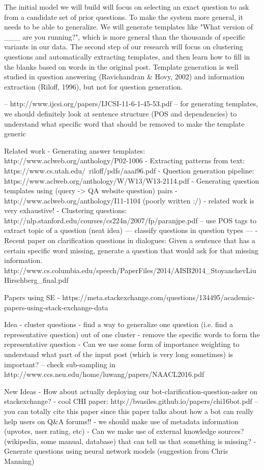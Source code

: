 \documentclass[11pt]{article}
\begin{document}
The initial model we will build will focus on selecting an exact question to ask from a candidate set of prior questions. To make the system more general, it needs to be able to generalize. We will generate templates like "What version of \_\_\_ are you running?", which is more general than the thousands of specific variants in our data. The second step of our research will focus on clustering questions and automatically extracting templates, and then learn how to fill in the blanks based on words in the original post. Template generation is well studied in question answering (Ravichandran \& Hovy, 2002) and information extraction (Riloff, 1996), but not for question generation.

-- http://www.ijcsi.org/papers/IJCSI-11-6-1-45-53.pdf
-- for generating templates, we should definitely look at sentence structure (POS and dependencies) to understand what specific word that should be removed to make the template generic

Related work
- Generating answer templates: http://www.aclweb.org/anthology/P02-1006
- Extracting patterns from text: https://www.cs.utah.edu/~riloff/pdfs/aaai96.pdf
- Question generation pipeline: https://www.aclweb.org/anthology/W/W13/W13-2114.pdf
- Generating question templates using (query -> QA website question) pairs - http://www.aclweb.org/anthology/I11-1104 (poorly written :/) - related work is very exhaustive!
- Clustering questions: http://nlp.stanford.edu/courses/cs224n/2007/fp/paranjpe.pdf -- use POS tags to extract topic of a question (neat idea) --- classify questions in question types --- 
- Recent paper on clarification questions in dialogues: Given a sentence that has a certain specific word missing, generate a question that would ask for that missing information. http://www.cs.columbia.edu/speech/PaperFiles/2014/AISB2014_StoyanchevLiuHirschberg_final.pdf

Papers using SE - https://meta.stackexchange.com/questions/134495/academic-papers-using-stack-exchange-data

Idea
- cluster questions
- find a way to generalize one question (i.e. find a representative question) out of one cluster
- remove the specific words to form the representative question
- Can we use some form of importance weighting to understand what part of the input post (which is very long sometimes) is important? -- check sub-sampling in http://www.ccs.neu.edu/home/luwang/papers/NAACL2016.pdf


New Ideas
- How about actually deploying our bot-clarification-question-asker on stackexchange? - cool CHI paper: http://bvasiles.github.io/papers/chi16bot.pdf -- you can totally cite this paper since this paper talks about how a bot can really help users on Q&A forums!!
- we should make use of metadata information (upvotes, user rating, etc)
- Can we make use of external knowledge sources? (wikipedia, some manual, database) that can tell us that something is missing?
- Generate questions using neural network models (suggestion from Chris Manning)
\end{document}
